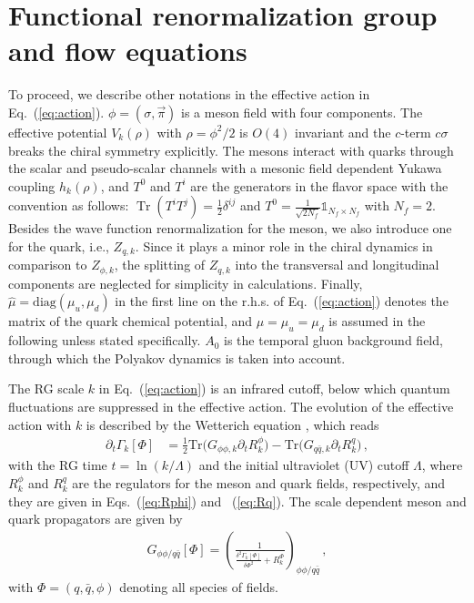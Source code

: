 \documentclass[%
reprint,
superscriptaddress,
showpacs,preprintnumbers,
 amsmath,amssymb,
 aps,
prd,
]{revtex4-1}
\newcommand{\Tr}{\ensuremath{\operatorname{Tr}}}
\def\Eq#1{Eq.~(\ref{#1})}
\begin{document}

\section{Functional renormalization group and flow equations}
\label{sec:FRG}

To proceed, we describe other notations in the effective action in \Eq{eq:action}. $\phi=\left(\sigma,\vec{\pi}\right)$ is a meson field with four components. The effective potential $V_k(\rho)$ with $\rho=\phi^2/2$ is $O(4)$ invariant and the $c$-term $c\sigma$ breaks the chiral symmetry explicitly. The mesons interact with quarks through the scalar and pseudo-scalar channels with a mesonic field dependent Yukawa coupling $h_k(\rho)$, and $T^0$ and $T^i$ are the generators in the flavor space with the convention as follows: $\Tr(T^{i}T^{j})=\frac{1}{2}\delta^{ij}$ and $T^{0}=\frac{1}{\sqrt{2N_{f}}}\mathbb{1}_{N_{f}\times N_{f}}$ with $N_{f}=2$. Besides the wave function renormalization for the meson, we also introduce one for the quark, i.e., $Z_{q,k}$. Since it plays a minor role in the chiral dynamics in comparison to $Z_{\phi,k}$, the splitting of $Z_{q,k}$ into the transversal and longitudinal components are neglected for simplicity in calculations. Finally, $\hat\mu=\mathrm{diag}(\mu_u,\mu_d)$ in the first line on the r.h.s. of \Eq{eq:action} denotes the matrix of the quark chemical potential, and $\mu=\mu_u=\mu_d$ is assumed in the following unless stated specifically. $A_0$ is the temporal gluon background field, through which the Polyakov dynamics is taken into account.

The RG scale $k$ in \Eq{eq:action} is an infrared cutoff, below which quantum fluctuations are suppressed in the effective action. The evolution of the effective action with $k$ is described by the Wetterich equation \cite{Wetterich:1992yh}, which reads 
\begin{align}
  \partial_t\Gamma_k[\Phi]&=\frac{1}{2}\mathrm{Tr}\big(G_{\phi\phi,k}\partial_t R^{\phi}_{k}\big)-\mathrm{Tr}\big(G_{q\bar{q},k}\partial_t R^{q}_{k}\big)\,, \label{eq:WetterichEqPQM}
\end{align}
with the RG time $t=\ln (k/\Lambda)$ and the initial ultraviolet (UV) cutoff $\Lambda$, where $R^{\phi}_{k}$ and $R^{q}_{k}$ are the regulators for the meson and quark fields, respectively, and they are given in Eqs.~(\ref{eq:Rphi}) and ~(\ref{eq:Rq}). The scale dependent meson and quark propagators are given by
\begin{align}
  G_{\phi\phi/q\bar{q}}[\Phi]=\left( \frac{1}{\frac{\delta^2\Gamma_k[\Phi]}{\delta\Phi^2}+R^{\Phi}_{k}} \right)_{\phi\phi/q\bar{q}}\,, \label{eq:props}
\end{align}
with $\Phi=(q,\bar q,\phi)$ denoting all species of fields.
\end{document}
